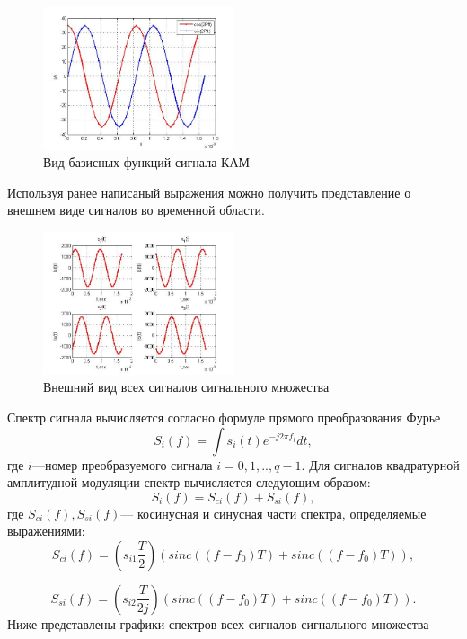 \begin{figure}[H]
	\centering
	\includegraphics[width=0.5\textwidth]{img/mal2}
	\caption{Вид базисных функций сигнала КАМ}
	\label{fig:mal2}
\end{figure}
  
Используя ранее написаный выражения можно получить представление о внешнем виде сигналов во временной области.
  \begin{figure}[H]
  	\centering
  	\includegraphics[width=0.5\textwidth]{img/mal3}
  	\caption{Внешний вид всех сигналов сигнального множества}
  	\label{fig:mal3}
  \end{figure}
Спектр сигнала вычисляется согласно формуле прямого преобразования Фурье
\begin{equation}
S_{i}(f)=\int s_{i}(t)e^{-j2\pi f_{t}}dt,
\end{equation}
где $i$---номер преобразуемого сигнала $i=0,1,..,q-1$. Для сигналов квадратурной амплитудной модуляции спектр вычисляется следующим образом:
\begin{equation}
S_{i}(f)=S_{ci}(f)+S_{si}(f),
\end{equation}
где $ S_{ci}(f),S_{si}(f) $--- косинусная и синусная части спектра, определяемые выражениями:
\begin{equation}
S_{ci}(f)=(s_{i1}\frac{T}{2})(sinc((f-f_{0})T)+sinc((f-f_{0})T)),
\end{equation}

\begin{equation}
S_{si}(f)=(s_{i2}\frac{T}{2j})(sinc((f-f_{0})T)+sinc((f-f_{0})T)).
\end{equation}
Ниже представлены графики спектров всех сигналов сигнального множества

